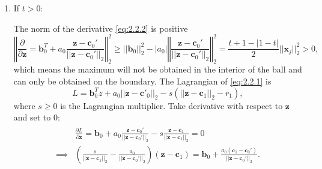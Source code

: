 \begin{enumerate}
    \item If $t>0$:
    
    The norm of the derivative \eqref{eq:2.2.2} is positive
    \begin{equation}
        \left\Vert\frac{\partial}{\partial\boldsymbol z}=\boldsymbol b_0^T+a_0\frac{\boldsymbol z-\boldsymbol c_0'}{||\boldsymbol z-\boldsymbol c_0'||_2}\right\Vert_2^2\geq ||\boldsymbol b_0||_2^2-|a_0|\left\Vert\frac{\boldsymbol z-\boldsymbol c_0'}{||\boldsymbol z-\boldsymbol c_0'||_2}\right\Vert_2^2=\frac{t+1-|1-t|}{2}||\boldsymbol x_j||_2^2>0,
    \end{equation}
    which means the maximum will not be obtained in the interior of the ball and can only be obtained on the boundary. The Lagrangian of \eqref{eq:2.2.1} is
    \begin{equation}
        L=\boldsymbol b_0^Tz+a_0||\boldsymbol z-\boldsymbol c'_0||_2-s(||\boldsymbol z-\boldsymbol c_1||_2-r_1),
    \end{equation}
    where $s\geq0$ is the Lagrangian multiplier. Take derivative with respect to $\boldsymbol z$ and set to 0:
    \begin{gather}
        \begin{aligned}
            &\frac{\partial L}{\partial \boldsymbol z}=\boldsymbol b_0+a_0\frac{\boldsymbol z-\boldsymbol c_0'}{||\boldsymbol z-\boldsymbol c_0'||_2}-s\frac{\boldsymbol z-\boldsymbol c_1}{||\boldsymbol z-\boldsymbol c_1||_2}=0\\
            \implies &\left(\frac{s}{||\boldsymbol z-\boldsymbol c_1||_2}-\frac{a_0}{||\boldsymbol z-\boldsymbol c_0'||_2}\right)(\boldsymbol z-\boldsymbol c_1)=\boldsymbol b_0+\frac{a_0(\boldsymbol c_1-\boldsymbol c_0')}{||\boldsymbol z- \boldsymbol c_0'||_2}.
        \end{aligned}
    \end{gather}
    

\end{enumerate}
